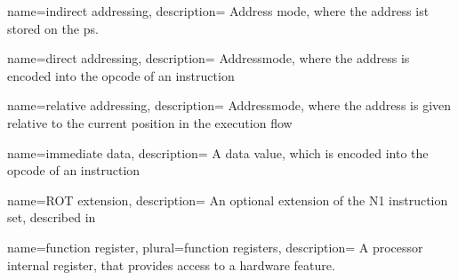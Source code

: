  {
    name={indirect addressing},
    description={
    Address mode, where the address ist stored on the \gls{ps}.
    \nopostdesc
    }
}

 {
    name={direct addressing},
    description={
    Addressmode, where the address is encoded into the \gls{opcode} of
    an instruction
    \nopostdesc
    }
}

 {
    name={relative addressing},
    description={
    Addressmode, where the address is given relative to the current position
    in the execution flow
    \nopostdesc    
    }
}

 {
    name={immediate data},
    description={
    A data value, which is encoded into the \gls{opcode} of an instruction
    \nopostdesc    
    }
}

 {
    name={ROT extension},
    description={
    An optional extension of the N1 instruction set, described in 
    \nopostdesc    
    }
}

 {
    name={function register},
    plural={function registers},
    description={
    A processor internal register, that provides access to a hardware feature.
    \nopostdesc    
    }
}


